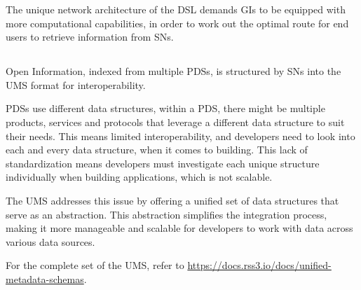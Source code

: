 The unique network architecture of the \gls{DSL} demands \glspl{GI} to be equipped with more computational capabilities, in order to work out the optimal route for end users to retrieve information from \glspl{SN}.

\subsection{}
\label{subsec:UMS}

Open Information, indexed from multiple \glspl{PDS}, is structured by \glspl{SN} into the \gls{UMS} format for interoperability.

\glspl{PDS} use different data structures, within a \gls{PDS}, there might be multiple products, services and protocols that leverage a different data structure to suit their needs. This means limited interoperability, and developers need to look into each and every data structure, when it comes to building. This lack of standardization means developers must investigate each unique structure individually when building applications, which is not scalable.

The \gls{UMS} addresses this issue by offering a unified set of data structures that serve as an abstraction. This abstraction simplifies the integration process, making it more manageable and scalable for developers to work with data across various data sources.

For the complete set of the \gls{UMS}, refer to \url{https://docs.rss3.io/docs/unified-metadata-schemas}.
